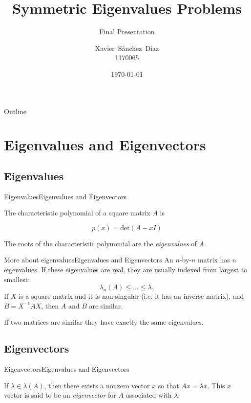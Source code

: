 \documentclass{beamer}
\title{Symmetric Eigenvalues Problems}
\subtitle{Final Presentation}
\author[X. S\'{a}nchez]{Xavier~S\'{a}nchez~D\'{i}az\\1170065}
\institute[ITESM] %
{
Applied Mathematics
}
\date{\today}
\begin{document}
\begin{frame}
\titlepage
\end{frame}



\begin{frame}[allowframebreaks=1]{Outline}
\tableofcontents[hideallsubsections=true]
\end{frame}



\section{Eigenvalues and Eigenvectors}

\subsection{Eigenvalues}

\begin{frame}{Eigenvalues}{Eigenvalues and Eigenvectors}

\begin{definition}
The characteristic polynomial of a square matrix $A$ is

\[p(x) = \text{det}(A - xI)\]

The roots of the characteristic polynomial are the \textit{eigenvalues} of $A$.
\end{definition}
\end{frame}

\begin{frame}{More about eigenvalues}{Eigenvalues and Eigenvectors}
An $n$-by-$n$ matrix has $n$ eigenvalues. If these eigenvalues are real, they are usually indexed from largest to smallest:
\[\lambda_n(A) \leq \dots \leq \lambda_1\]
\pause
If $X$ is a square matrix and it is non-singular (i.e. it has an inverse matrix), and $B = X^{-1} AX$, then $A$ and $B$ are similar.
\pause

If two matrices are similar they have \alert{exactly} the same eigenvalues.
\end{frame}

\subsection{Eigenvectors}

\begin{frame}{Eigenvectors}{Eigenvalues and Eigenvectors}
\begin{definition}
If $\lambda \in \lambda (A)$, then there exists a nonzero vector $x$ so that $Ax = \lambda x$. This $x$ vector is said to be an \textit{eigenvector} for $A$ associated with $\lambda$.
\end{definition}
\end{frame}
\end{document}
